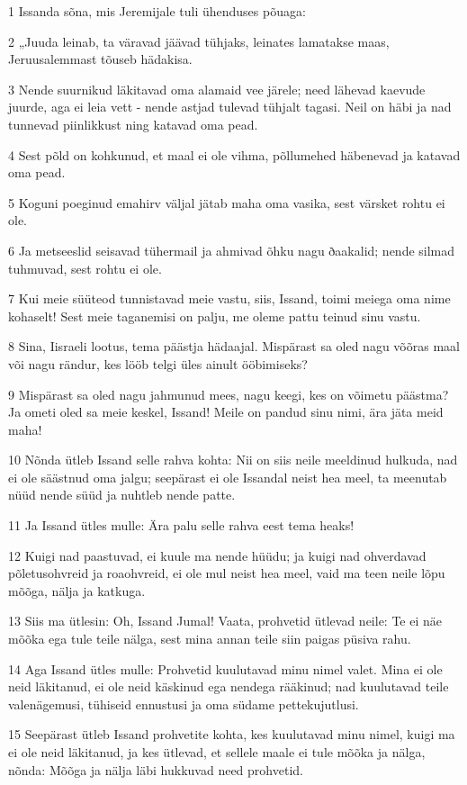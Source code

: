 \par 1 Issanda sõna, mis Jeremijale tuli ühenduses põuaga:
\par 2 „Juuda leinab, ta väravad jäävad tühjaks, leinates lamatakse maas, Jeruusalemmast tõuseb hädakisa.
\par 3 Nende suurnikud läkitavad oma alamaid vee järele; need lähevad kaevude juurde, aga ei leia vett - nende astjad tulevad tühjalt tagasi. Neil on häbi ja nad tunnevad piinlikkust ning katavad oma pead.
\par 4 Sest põld on kohkunud, et maal ei ole vihma, põllumehed häbenevad ja katavad oma pead.
\par 5 Koguni poeginud emahirv väljal jätab maha oma vasika, sest värsket rohtu ei ole.
\par 6 Ja metseeslid seisavad tühermail ja ahmivad õhku nagu ðaakalid; nende silmad tuhmuvad, sest rohtu ei ole.
\par 7 Kui meie süüteod tunnistavad meie vastu, siis, Issand, toimi meiega oma nime kohaselt! Sest meie taganemisi on palju, me oleme pattu teinud sinu vastu.
\par 8 Sina, Iisraeli lootus, tema päästja hädaajal. Mispärast sa oled nagu võõras maal või nagu rändur, kes lööb telgi üles ainult ööbimiseks?
\par 9 Mispärast sa oled nagu jahmunud mees, nagu keegi, kes on võimetu päästma? Ja ometi oled sa meie keskel, Issand! Meile on pandud sinu nimi, ära jäta meid maha!
\par 10 Nõnda ütleb Issand selle rahva kohta: Nii on siis neile meeldinud hulkuda, nad ei ole säästnud oma jalgu; seepärast ei ole Issandal neist hea meel, ta meenutab nüüd nende süüd ja nuhtleb nende patte.
\par 11 Ja Issand ütles mulle: Ära palu selle rahva eest tema heaks!
\par 12 Kuigi nad paastuvad, ei kuule ma nende hüüdu; ja kuigi nad ohverdavad põletusohvreid ja roaohvreid, ei ole mul neist hea meel, vaid ma teen neile lõpu mõõga, nälja ja katkuga.
\par 13 Siis ma ütlesin: Oh, Issand Jumal! Vaata, prohvetid ütlevad neile: Te ei näe mõõka ega tule teile nälga, sest mina annan teile siin paigas püsiva rahu.
\par 14 Aga Issand ütles mulle: Prohvetid kuulutavad minu nimel valet. Mina ei ole neid läkitanud, ei ole neid käskinud ega nendega rääkinud; nad kuulutavad teile valenägemusi, tühiseid ennustusi ja oma südame pettekujutlusi.
\par 15 Seepärast ütleb Issand prohvetite kohta, kes kuulutavad minu nimel, kuigi ma ei ole neid läkitanud, ja kes ütlevad, et sellele maale ei tule mõõka ja nälga, nõnda: Mõõga ja nälja läbi hukkuvad need prohvetid.

